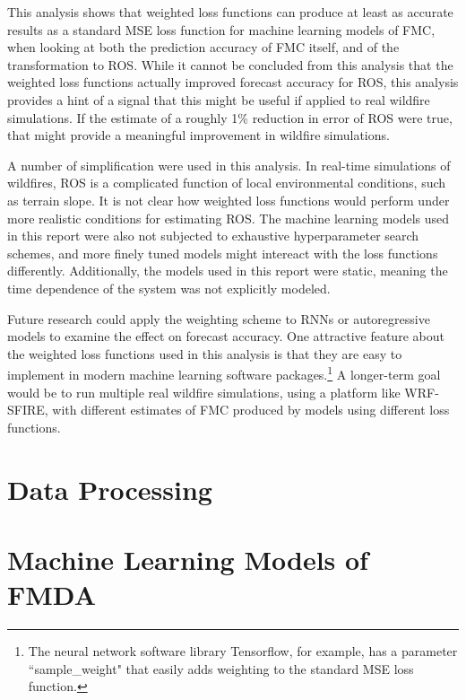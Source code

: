 \documentclass[11pt]{article}%
\begin{document}
This analysis shows that weighted loss functions can produce at least as accurate results as a standard MSE loss function for machine learning models of FMC, when looking at both the prediction accuracy of FMC itself, and of the transformation to ROS. While it cannot be concluded from this analysis that the weighted loss functions actually improved forecast accuracy for ROS, this analysis provides a hint of a signal that this might be useful if applied to real wildfire simulations. If the estimate of a roughly 1\% reduction in error of ROS were true, that might provide a meaningful improvement in wildfire simulations.

A number of simplification were used in this analysis. In real-time simulations of wildfires, ROS is a complicated function of local environmental conditions, such as terrain slope. It is not clear how weighted loss functions would perform under more realistic conditions for estimating ROS. The machine learning models used in this report were also not subjected to exhaustive hyperparameter search schemes, and more finely tuned models might intereact with the loss functions differently. Additionally, the models used in this report were static, meaning the time dependence of the system was not explicitly modeled. 

Future research could apply the weighting scheme to RNNs or autoregressive models to examine the effect on forecast accuracy. One attractive feature about the weighted loss functions used in this analysis is that they are easy to implement in modern machine learning software packages.\footnote{The neural network software library Tensorflow, for example, has a parameter ``sample\_weight" that easily adds weighting to the standard MSE loss function.} A longer-term goal would be to run multiple real wildfire simulations, using a platform like WRF-SFIRE, with different estimates of FMC produced by models using different loss functions.


\newpage




\appendix
\section{Data Processing} 
\label{app:data}

\section{Machine Learning Models of FMDA} 
\label{app:ml}

\end{document}
